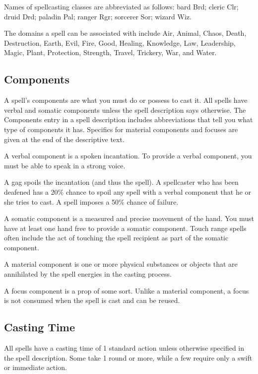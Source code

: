 Names of spellcasting classes are abbreviated as follows: bard Brd; cleric Clr; druid Drd; paladin Pal; ranger Rgr; sorcerer Sor; wizard Wiz.

The domains a spell can be associated with include Air, Animal, Chaos, Death, Destruction, Earth, Evil, Fire, Good, Healing, Knowledge, Law, Leadership, Magic, Plant, Protection, Strength, Travel, Trickery, War, and Water.

\subsection{Components}
A spell's components are what you must do or possess to cast it. All spells have verbal and somatic components unless the spell description says otherwise. The Components entry in a spell description includes abbreviations that tell you what type of components it has. Specifics for material components and focuses are given at the end of the descriptive text.

 A verbal component is a spoken incantation. To provide a verbal component, you must be able to speak in a strong voice.

A gag spoils the incantation (and thus the spell). A spellcaster who has been deafened has a 20\% chance to spoil any spell with a verbal component that he or she tries to cast. A  spell imposes a 50\% chance of failure.

 A somatic component is a measured and precise movement of the hand. You must have at least one hand free to provide a somatic component. Touch range spells often include the act of touching the spell recipient as part of the somatic component.

 A material component is one or more physical substances or objects that are annihilated by the spell energies in the casting process.

 A focus component is a prop of some sort. Unlike a material component, a focus is not consumed when the spell is cast and can be reused.

\subsection{Casting Time}
All spells have a casting time of 1 standard action unless otherwise specified in the spell description. Some take 1 round or more, while a few require only a swift or immediate action.

